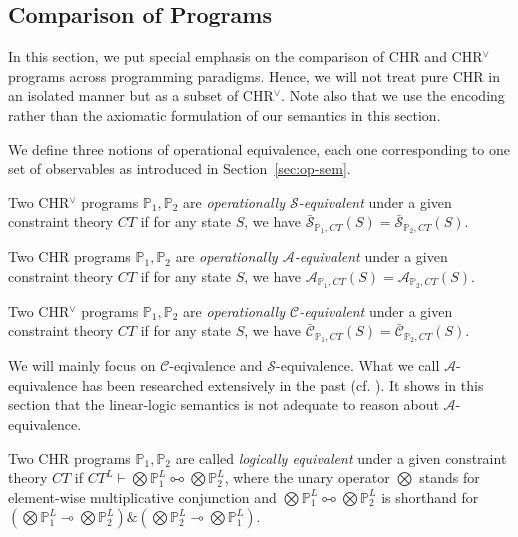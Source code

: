 \documentclass[acmtocl]{acmtrans2m}
\newcommand{\bbP}{\ensuremath{\mathbb{P}}}
\newcommand{\cA}{\ensuremath{\mathcal{A}}}
\newcommand{\cS}{\ensuremath{\mathcal{S}}}
\newcommand{\cC}{\ensuremath{\mathcal{C}}}
\newcommand{\bcS}{\ensuremath{\bar{\mathcal{S}}}}
\newcommand{\bcC}{\ensuremath{\bar{\mathcal{C}}}}
\newcommand{\lp}{\multimap}
\newcommand{\lpl}{\multimapboth}
\begin{document}
\subsection{Comparison of Programs}
\label{sec:app:comparison}

In this section, we put special emphasis on the comparison of CHR and CHR$^\vee$
programs across programming paradigms. Hence, we will not treat pure CHR in an
isolated manner but as a subset of CHR$^\vee$. Note also that we use the
encoding rather than the axiomatic formulation of our semantics in this section.

We define three notions of operational equivalence, each one corresponding to
one set of observables as introduced in Section~\ref{sec:op-sem}.

\begin{definition}
\begin{longenum}
  \item Two CHR$^\vee$ programs $\bbP_1,\bbP_2$ are \emph{operationally
  $\cS$-equivalent} under a given constraint theory $CT$ if for any state $S$, we have
  $\bcS_{\bbP_1,CT}(S)=\bcS_{\bbP_2,CT}(S)$.
  \item Two CHR programs $\bbP_1,\bbP_2$ are \emph{operationally
  $\cA$-equivalent} under a given constraint theory $CT$ if for
  any state $S$, we have $\cA_{\bbP_1,CT}(S)=\cA_{\bbP_2,CT}(S)$.
  \item Two CHR$^\vee$ programs $\bbP_1,\bbP_2$ are \emph{operationally
  $\cC$-equivalent} under a given constraint theory $CT$ if for any state $S$, we have
  $\bcC_{\bbP_1,CT}(S)=\bcC_{\bbP_2,CT}(S)$.
\end{longenum}
\end{definition}

We will mainly focus on $\cC$-eqivalence and $\cS$-equivalence.
What we call $\cA$-equivalence has been researched extensively in the past
(cf. ). It shows in this
section that the linear-logic semantics is not adequate to reason about
$\cA$-equivalence.

\begin{definition} Two CHR programs
$\bbP_1,\bbP_2$ are called \emph{logically equivalent} under a given constraint
theory $CT$ if $CT^L\vdash\bigotimes\bbP^L_1 \lpl \bigotimes\bbP^L_2$, where the unary
operator $\bigotimes$ stands for element-wise multiplicative conjunction and
$\bigotimes\bbP^L_1 \lpl \bigotimes\bbP^L_2$ is shorthand for
$(\bigotimes\bbP^L_1 \lp \bigotimes\bbP^L_2) \& (\bigotimes\bbP^L_2 \lp
\bigotimes\bbP^L_1)$.
\end{definition}
\end{document}
